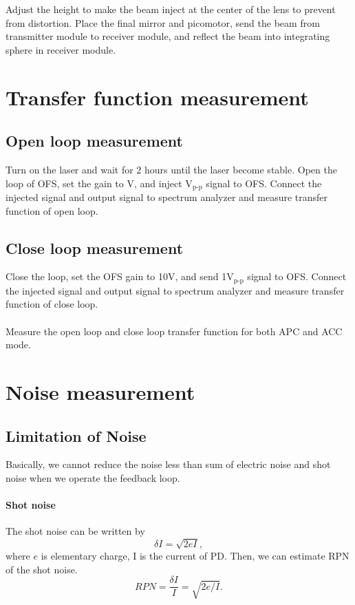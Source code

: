 

Adjust the height to make the beam inject at the center of the lens to prevent from distortion. Place the final mirror and picomotor, send the beam from transmitter module to receiver module, and reflect the beam into integrating sphere in receiver module.

\section{Transfer function measurement}
\subsection{Open loop measurement}
Turn on the laser and wait for 2 hours until the laser become stable. Open the loop of OFS, set the gain to \underline{\qquad} V, and inject \underline{\qquad} $\mbox{V}_{\mbox{p-p}}$ signal to OFS. Connect the injected signal and output signal to spectrum analyzer and measure transfer function of open loop.
\subsection{Close loop measurement}
Close the loop, set the OFS gain to 10V, and send 1$\mbox{V}_{\mbox{p-p}}$ signal to OFS. Connect the injected signal and output signal to spectrum analyzer and measure transfer function of close loop.
\\\\
\noindent Measure the open loop and close loop transfer function for both APC and ACC mode.

\section{Noise measurement}
\subsection{Limitation of Noise}
Basically, we cannot reduce the noise less than sum of electric noise and shot noise when we operate the feedback loop.
\paragraph{Shot noise}
The shot noise can be written by
\begin{equation}
\delta I=\sqrt{2eI},
\end{equation}
where $e$ is elementary charge, I is the current of PD. Then, we can estimate RPN of the shot noise.
\begin{equation}
RPN=\frac{\delta I}{I}=\sqrt{2e/I}.
\end{equation}

